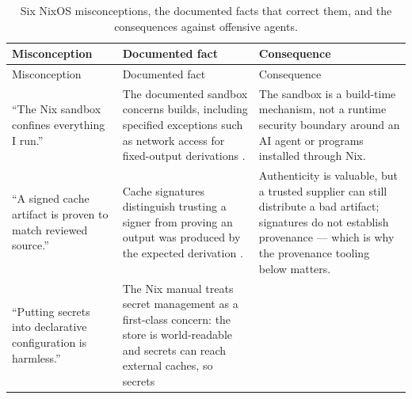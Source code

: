 \documentclass[
  english,
  9pt,
]{extarticle}
\begin{document}
\begin{longtable}[]{@{}
  >{\raggedright\arraybackslash}p{}
  >{\raggedright\arraybackslash}p{}
  >{\raggedright\arraybackslash}p{}@{}}
\caption{Six NixOS misconceptions, the documented facts that correct
them, and the consequences against offensive
agents.}\label{tbl:nixos_misconceptions}\tabularnewline
\toprule\noalign{}
\begin{minipage}[b]{\linewidth}\raggedright
Misconception
\end{minipage} & \begin{minipage}[b]{\linewidth}\raggedright
Documented fact
\end{minipage} & \begin{minipage}[b]{\linewidth}\raggedright
Consequence
\end{minipage} \\
\midrule\noalign{}
\endfirsthead
\toprule\noalign{}
\begin{minipage}[b]{\linewidth}\raggedright
Misconception
\end{minipage} & \begin{minipage}[b]{\linewidth}\raggedright
Documented fact
\end{minipage} & \begin{minipage}[b]{\linewidth}\raggedright
Consequence
\end{minipage} \\
\midrule\noalign{}
\endhead
\bottomrule\noalign{}
\endlastfoot
``The Nix sandbox confines everything I run.'' & The documented sandbox
concerns builds, including specified exceptions such as network access
for fixed-output derivations \citep{nix_sandbox_config}. & The sandbox
is a build-time mechanism, not a runtime security boundary around an AI
agent or programs installed through Nix. \\
``A signed cache artifact is proven to match reviewed source.'' & Cache
signatures distinguish trusting a signer from proving an output was
produced by the expected derivation \citep{nix_cache_signatures}. &
Authenticity is valuable, but a trusted supplier can still distribute a
bad artifact; signatures do not establish provenance --- which is why
the provenance tooling below matters. \\
``Putting secrets into declarative configuration is harmless.'' & The
Nix manual treats secret management as a first-class concern: the store
is world-readable and secrets can reach external caches, so secrets

\end{longtable}
\end{document}
